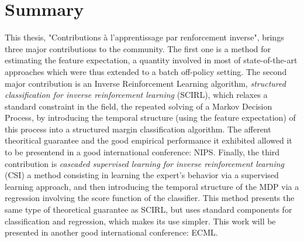 \documentclass[11pt]{article}
\begin{document}
\section*{Summary}
This thesis, "Contributions à l'apprentissage par renforcement inverse", brings three major contributions to the community.
The first one is a method for estimating the feature expectation, a quantity involved in most of state-of-the-art approaches which were thus extended to a batch off-policy setting.
The second major contribution is an Inverse Reinforcement Learning algorithm, 
{\em structured classification for inverse reinforcement learning}
(SCIRL), which relaxes a standard constraint in the field, the repeated solving of a Markov Decision Process, by introducing the temporal structure (using the feature expectation) of this process into a structured margin classification algorithm.
The afferent theoritical guarantee and the good empirical performance it exhibited allowed it to be presentend in a good international conference: NIPS.
Finally, the third contribution is {\em cascaded supervised learning for inverse reinforcement learning}
(CSI) a method consisting in learning the expert's behavior via a supervised learning approach, and then introducing the temporal structure of the MDP via a regression involving the score function of the classifier. This method presents the same type of theoretical guarantee as SCIRL, but uses standard components for classification and regression, which makes its use simpler. This work will be presented in another good international conference: ECML.
\end{document}
